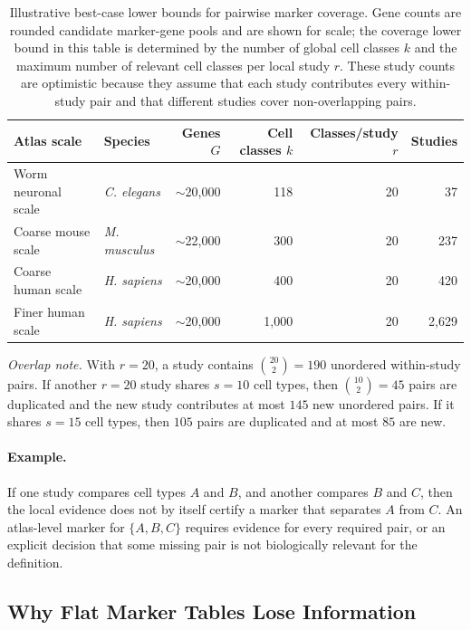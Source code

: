 \documentclass{article}
\begin{document}
\begin{table}[h]
\centering
\small
\begin{tabular}{llrrrr}
\toprule
Atlas scale & Species & Genes $G$ & Cell classes $k$ & Classes/study $r$ & Studies \\
\midrule
Worm neuronal scale & \textit{C. elegans} & $\sim$20{,}000 & 118 & 20 & 37 \\
Coarse mouse scale & \textit{M. musculus} & $\sim$22{,}000 & 300 & 20 & 237 \\
Coarse human scale & \textit{H. sapiens} & $\sim$20{,}000 & 400 & 20 & 420 \\
Finer human scale & \textit{H. sapiens} & $\sim$20{,}000 & 1{,}000 & 20 & 2{,}629 \\
\bottomrule
\end{tabular}
\caption{Illustrative best-case lower bounds for pairwise marker coverage. Gene counts are rounded candidate marker-gene pools and are shown for scale; the coverage lower bound in this table is determined by the number of global cell classes $k$ and the maximum number of relevant cell classes per local study $r$. These study counts are optimistic because they assume that each study contributes every within-study pair and that different studies cover non-overlapping pairs.}
\label{tab:experiment-coverage-scale}
\end{table}

\noindent\emph{Overlap note.}
With $r=20$, a study contains $\binom{20}{2}=190$ unordered within-study pairs. If another $r=20$ study shares $s=10$ cell types, then $\binom{10}{2}=45$ pairs are duplicated and the new study contributes at most $145$ new unordered pairs. If it shares $s=15$ cell types, then $105$ pairs are duplicated and at most $85$ are new.

\paragraph{Example.}
If one study compares cell types $A$ and $B$, and another compares $B$ and $C$, then the local evidence does not by itself certify a marker that separates $A$ from $C$. An atlas-level marker for $\{A,B,C\}$ requires evidence for every required pair, or an explicit decision that some missing pair is not biologically relevant for the definition.

\subsection{Why Flat Marker Tables Lose Information}
\end{document}

